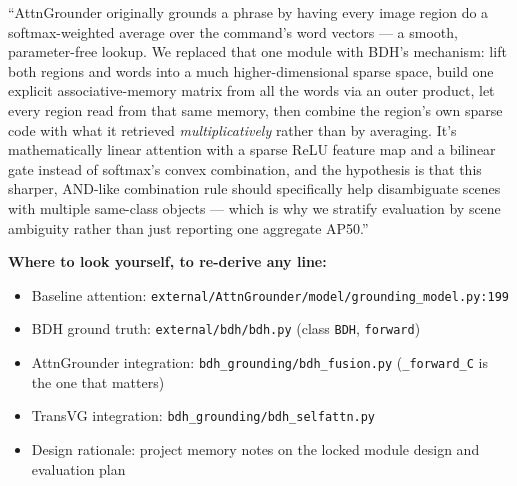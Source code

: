 \documentclass[11pt]{article}
\newlength{\boxinnerwidth}
\newenvironment{keybox}[1][]{%
  \def\tmptitle{#1}%
  \setlength{\boxinnerwidth}{\dimexpr\linewidth-2\fboxsep-2\fboxrule\relax}%
  \begin{lrbox}{\keyboxbin}
  \begin{minipage}{\boxinnerwidth}
  \ifx\tmptitle\empty\else\noindent\textbf{\tmptitle}\par\smallskip\fi
}{%
  \end{minipage}
  \end{lrbox}%
  \par\addvspace{8pt}\noindent\fcolorbox{blue!35!black}{blue!4}{\usebox{\keyboxbin}}\par\addvspace{8pt}%
}
\begin{document}
\begin{keybox}
``AttnGrounder originally grounds a phrase by having every image region do a
softmax-weighted average over the command's word vectors --- a smooth,
parameter-free lookup. We replaced that one module with BDH's mechanism: lift both
regions and words into a much higher-dimensional sparse space, build one explicit
associative-memory matrix from all the words via an outer product, let every
region read from that same memory, then combine the region's own sparse code with
what it retrieved \emph{multiplicatively} rather than by averaging. It's
mathematically linear attention with a sparse ReLU feature map and a bilinear gate
instead of softmax's convex combination, and the hypothesis is that this sharper,
AND-like combination rule should specifically help disambiguate scenes with
multiple same-class objects --- which is why we stratify evaluation by scene
ambiguity rather than just reporting one aggregate AP50.''
\end{keybox}

\vspace{1em}
\noindent\textbf{Where to look yourself, to re-derive any line:}
\begin{itemize}[leftmargin=1.4em, itemsep=2pt]
  \item Baseline attention: \texttt{external/AttnGrounder/model/grounding\_model.py:199}
  \item BDH ground truth: \texttt{external/bdh/bdh.py} (class \texttt{BDH}, \texttt{forward})
  \item AttnGrounder integration: \texttt{bdh\_grounding/bdh\_fusion.py} (\texttt{\_forward\_C} is the one that matters)
  \item TransVG integration: \texttt{bdh\_grounding/bdh\_selfattn.py}
  \item Design rationale: project memory notes on the locked module design and evaluation plan
\end{itemize}
\end{document}
